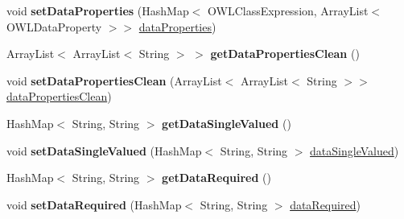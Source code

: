 \begin{DoxyCompactItemize}
\item 
\hypertarget{class_ontology_1_1_data_property_a69d287f17078104f18872dcd54aee52b}{
void {\bfseries setDataProperties} (HashMap$<$ OWLClassExpression, ArrayList$<$ OWLDataProperty $>$$>$ \hyperlink{class_ontology_1_1_data_property_af2428254ca584e305288b51f6645e250}{dataProperties})}
\label{class_ontology_1_1_data_property_a69d287f17078104f18872dcd54aee52b}

\item 
\hypertarget{class_ontology_1_1_data_property_a500aa972067c093a97fce9809fe9fefb}{
ArrayList$<$ ArrayList$<$ String $>$ $>$ {\bfseries getDataPropertiesClean} ()}
\label{class_ontology_1_1_data_property_a500aa972067c093a97fce9809fe9fefb}

\item 
\hypertarget{class_ontology_1_1_data_property_aba80c3c2b7a61f5a664a211f26503add}{
void {\bfseries setDataPropertiesClean} (ArrayList$<$ ArrayList$<$ String $>$$>$ \hyperlink{class_ontology_1_1_data_property_a016e25b09967876b7191033daab24d2c}{dataPropertiesClean})}
\label{class_ontology_1_1_data_property_aba80c3c2b7a61f5a664a211f26503add}

\item 
\hypertarget{class_ontology_1_1_data_property_ab9f0476f4fabba984e9f0517b569a534}{
HashMap$<$ String, String $>$ {\bfseries getDataSingleValued} ()}
\label{class_ontology_1_1_data_property_ab9f0476f4fabba984e9f0517b569a534}

\item 
\hypertarget{class_ontology_1_1_data_property_ab192a6fa2584d58cbbffcadbcf9785cc}{
void {\bfseries setDataSingleValued} (HashMap$<$ String, String $>$ \hyperlink{class_ontology_1_1_data_property_a2de9cc72a21e027da8208f9a2df0bd56}{dataSingleValued})}
\label{class_ontology_1_1_data_property_ab192a6fa2584d58cbbffcadbcf9785cc}

\item 
\hypertarget{class_ontology_1_1_data_property_ac53aaf738e90f05d28ac40945f1c8d45}{
HashMap$<$ String, String $>$ {\bfseries getDataRequired} ()}
\label{class_ontology_1_1_data_property_ac53aaf738e90f05d28ac40945f1c8d45}

\item 
\hypertarget{class_ontology_1_1_data_property_a8e13a7f7817f88727bf6297f4113a21b}{
void {\bfseries setDataRequired} (HashMap$<$ String, String $>$ \hyperlink{class_ontology_1_1_data_property_aa8750eab83c0207b3acc8b87581e84c7}{dataRequired})}
\label{class_ontology_1_1_data_property_a8e13a7f7817f88727bf6297f4113a21b}


\end{DoxyCompactItemize}
